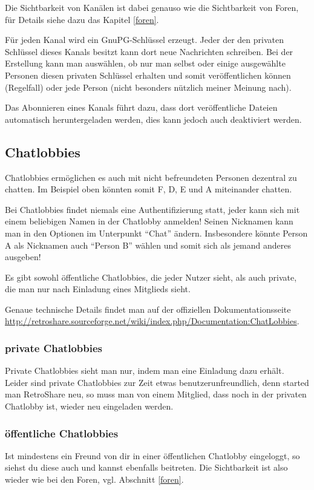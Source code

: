 Die Sichtbarkeit von Kanälen ist dabei genauso wie die Sichtbarkeit von Foren, für Details siehe dazu das Kapitel \ref{foren}.

Für jeden Kanal wird ein GnuPG-Schlüssel erzeugt. Jeder der den privaten Schlüssel dieses Kanals besitzt kann dort neue Nachrichten schreiben. Bei der Erstellung kann man auswählen, ob nur man selbst oder einige ausgewählte Personen diesen privaten Schlüssel erhalten und somit veröffentlichen können (Regelfall) oder jede Person (nicht besonders nützlich meiner Meinung nach).

Das Abonnieren eines Kanals führt dazu, dass dort veröffentliche Dateien automatisch heruntergeladen werden, dies kann jedoch auch deaktiviert werden.

\subsection{Chatlobbies}
Chatlobbies ermöglichen es auch mit nicht befreundeten Personen dezentral zu chatten. Im Beispiel oben könnten somit F, D, E und A miteinander chatten.


Bei Chatlobbies findet niemals eine Authentifizierung statt, jeder kann sich mit einem beliebigen Namen in der Chatlobby anmelden! Seinen Nicknamen kann man in den Optionen im Unterpunkt ``Chat'' ändern. Insbesondere könnte Person A als Nicknamen auch ``Person B'' wählen und somit sich als jemand anderes ausgeben!

Es gibt sowohl öffentliche Chatlobbies, die jeder Nutzer sieht, als auch private, die man nur nach Einladung eines Mitglieds sieht.

Genaue technische Details findet man auf der offiziellen Dokumentationsseite \url{http://retroshare.sourceforge.net/wiki/index.php/Documentation:ChatLobbies}.

\subsubsection{private Chatlobbies}
Private Chatlobbies sieht man nur, indem man eine Einladung dazu erhält. Leider sind private Chatlobbies zur Zeit etwas benutzerunfreundlich, denn started man RetroShare neu, so muss man von einem Mitglied, dass noch in der privaten Chatlobby ist, wieder neu eingeladen werden.

\subsubsection{öffentliche Chatlobbies}
Ist mindestens ein Freund von dir in einer öffentlichen Chatlobby eingeloggt, so siehst du diese auch und kannst ebenfalls beitreten. Die Sichtbarkeit ist also wieder wie bei den Foren, vgl. Abschnitt \ref{foren}.

